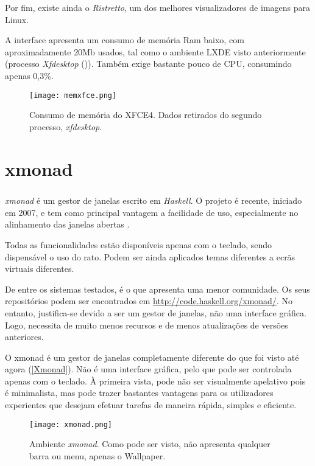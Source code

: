 \documentclass[11pt,openright,twoside]{report}
\begin{document}
Por fim, existe ainda o \textit{Ristretto}, um dos melhores visualizadores de imagens para Linux.

A interface apresenta um consumo de memória Ram baixo, com aproximadamente 20Mb usados, tal como o ambiente LXDE visto anteriormente (processo \textit{Xfdesktop} ()). Também exige bastante pouco de CPU, consumindo apenas 0,3\%.

\begin{figure}
 \center
 \texttt{[image: memxfce.png]}
 \caption{Consumo de memória do XFCE4. Dados retirados do segundo processo, \textit{xfdesktop}.}
 \label{memxfce}
\end{figure}



\chapter{xmonad}

\paragraph{  }\textit{xmonad} é um gestor de janelas escrito em \textit{Haskell}. O projeto é recente, iniciado em 2007, e tem como principal vantagem a facilidade de uso, especialmente no alinhamento das janelas abertas \cite{Xmonad}.

Todas as funcionalidades estão disponíveis apenas com o teclado, sendo dispensável o uso do rato. Podem ser ainda aplicados temas diferentes a ecrãs virtuais diferentes.

De entre os sistemas testados, é o que apresenta uma menor comunidade. Os seus repositórios podem ser encontrados em \url{http://code.haskell.org/xmonad/}. No entanto, justifica-se devido a ser um gestor de janelas, não uma interface gráfica. Logo, necessita de muito menos recursos e de menos atualizações de versões anteriores.

O xmonad é um gestor de janelas completamente diferente do que foi visto até agora (\autoref{Xmonad}). Não é uma interface gráfica, pelo que pode ser controlada apenas com o teclado. À primeira vista, pode não ser visualmente apelativo pois é minimalista, mas pode trazer bastantes vantagens para os utilizadores experientes que desejam efetuar tarefas de maneira rápida, simples e eficiente.

\begin{figure}
 \center
 \texttt{[image: xmonad.png]}
 \caption{Ambiente \textit{xmonad}. Como pode ser visto, não apresenta qualquer barra ou menu, apenas o Wallpaper.}
 \label{Xmonad}
\end{figure}
\end{document}
